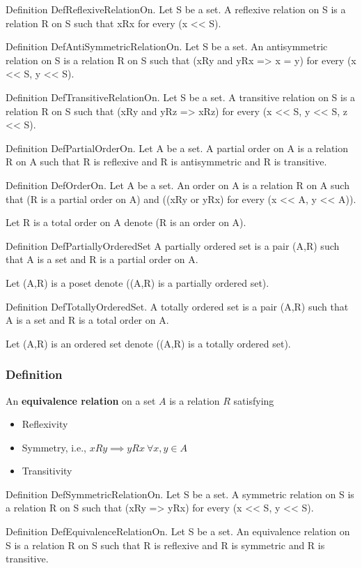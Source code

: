 \begin{forthel}
Definition DefReflexiveRelationOn. 
    Let S be a set.
    A reflexive relation on S is a relation R on S such that
    xRx for every (x << S).

Definition DefAntiSymmetricRelationOn. 
    Let S be a set.
    An antisymmetric relation on S is a relation R on S such that
    (xRy and yRx => x = y) for every (x << S, y << S).

Definition DefTransitiveRelationOn.
    Let S be a set.
    A transitive relation on S is a relation R on S such that
    (xRy and yRz => xRz) for every (x << S, y << S, z << S).

Definition DefPartialOrderOn.
    Let A be a set.
    A partial order on A is a relation R on A such that
    R is reflexive and R is antisymmetric and R is transitive.

Definition DefOrderOn.
    Let A be a set.
    An order on A is a relation R on A such that
    (R is a partial order on A) and ((xRy or yRx) for every (x << A, y << A)).

Let R is a total order on A denote (R is an order on A).

Definition DefPartiallyOrderedSet
    A partially ordered set is a pair (A,R) such that A is a set and R is a partial order on A.

Let (A,R) is a poset denote ((A,R) is a partially ordered set).

Definition DefTotallyOrderedSet.
    A totally ordered set is a pair (A,R) such that A is a set and R is a total order on A.

Let (A,R) is an ordered set denote ((A,R) is a totally ordered set).
\end{forthel}

\subsubsection{Definition}
\begin{true}
An \textbf{equivalence relation} on a set $A$ is a relation $R$ satisfying
\begin{itemize}
    \item Reflexivity
    \item Symmetry, i.e., $xRy \implies yRx \ \forall x,y \in A$
    \item Transitivity
\end{itemize}
\end{true}
\begin{forthel}
Definition DefSymmetricRelationOn. 
    Let S be a set.
    A symmetric relation on S is a relation R on S such that
    (xRy => yRx) for every (x << S, y << S).

Definition DefEquivalenceRelationOn.
    Let S be a set.
    An equivalence relation on S is a relation R on S such that
    R is reflexive and R is symmetric and R is transitive.
\end{forthel}

